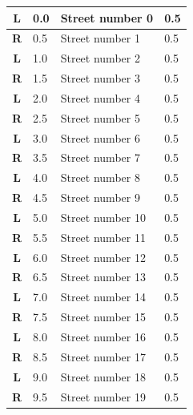 \documentclass[11pt]{article}
\begin{document}
\renewcommand{\arraystretch}{1.15}
\twocolumn
{}
\tabletail{\hline}
\tablelasttail{\hline}
\begin{center}
  \begin{supertabular}{|c|p{0.30in}|p{2.25in}|l|}
  \hline
 \textbf{L} &   0.0 & Street number 0 &   0.5 \\ \hline
{} \textbf{R} &   0.5 & Street number 1 &   0.5 \\ \hline
 \textbf{L} &   1.0 & Street number 2 &   0.5 \\ \hline
{} \textbf{R} &   1.5 & Street number 3 &   0.5 \\ \hline
 \textbf{L} &   2.0 & Street number 4 &   0.5 \\ \hline
{} \textbf{R} &   2.5 & Street number 5 &   0.5 \\ \hline
 \textbf{L} &   3.0 & Street number 6 &   0.5 \\ \hline
{} \textbf{R} &   3.5 & Street number 7 &   0.5 \\ \hline
 \textbf{L} &   4.0 & Street number 8 &   0.5 \\ \hline
{} \textbf{R} &   4.5 & Street number 9 &   0.5 \\ \hline
 \textbf{L} &   5.0 & Street number 10 &   0.5 \\ \hline
{} \textbf{R} &   5.5 & Street number 11 &   0.5 \\ \hline
 \textbf{L} &   6.0 & Street number 12 &   0.5 \\ \hline
{} \textbf{R} &   6.5 & Street number 13 &   0.5 \\ \hline
 \textbf{L} &   7.0 & Street number 14 &   0.5 \\ \hline
{} \textbf{R} &   7.5 & Street number 15 &   0.5 \\ \hline
 \textbf{L} &   8.0 & Street number 16 &   0.5 \\ \hline
{} \textbf{R} &   8.5 & Street number 17 &   0.5 \\ \hline
 \textbf{L} &   9.0 & Street number 18 &   0.5 \\ \hline
{} \textbf{R} &   9.5 & Street number 19 &   0.5 \\ \hline

\end{supertabular}
\end{center}
\end{document}
